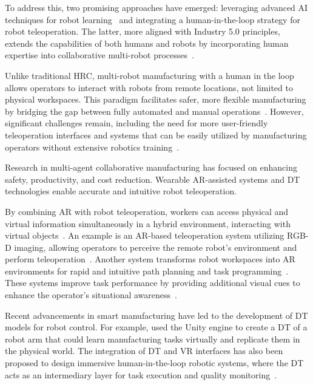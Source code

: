 To address this, two promising approaches have emerged: leveraging advanced \ac{AI} techniques for robot learning~\cite{6} and integrating a human-in-the-loop strategy for robot teleoperation. The latter, more aligned with Industry 5.0 principles, extends the capabilities of both humans and robots by incorporating human expertise into collaborative multi-robot processes~\cite{7}.

Unlike traditional \ac{HRC}, multi-robot manufacturing with a human in the loop allows operators to interact with robots from remote locations, not limited to physical workspaces. This paradigm facilitates safer, more flexible manufacturing by bridging the gap between fully automated and manual operations~\cite{7}. However, significant challenges remain, including the need for more user-friendly teleoperation interfaces and systems that can be easily utilized by manufacturing operators without extensive robotics training~\cite{9}.

Research in multi-agent collaborative manufacturing has focused on enhancing safety, productivity, and cost reduction. Wearable \ac{AR}-assisted systems and \ac{DT} technologies enable accurate and intuitive robot teleoperation. 

By combining \ac{AR} with robot teleoperation, workers can access physical and virtual information simultaneously in a hybrid environment, interacting with virtual objects~\cite{26,27}. An example is an \ac{AR}-based teleoperation system utilizing RGB-D imaging, allowing operators to perceive the remote robot's environment and perform teleoperation~\cite{10}. Another system transforms robot workspaces into \ac{AR} environments for rapid and intuitive path planning and task programming~\cite{30}. These systems improve task performance by providing additional visual cues to enhance the operator's situational awareness~\cite{32}.

Recent advancements in smart manufacturing have led to the development of \ac{DT} models for robot control. For example, \cite{37} used the Unity engine to create a \ac{DT} of a robot arm that could learn manufacturing tasks virtually and replicate them in the physical world. The integration of \ac{DT} and \ac{VR} interfaces has also been proposed to design immersive human-in-the-loop robotic systems, where the \ac{DT} acts as an intermediary layer for task execution and quality monitoring~\cite{41,42}.


